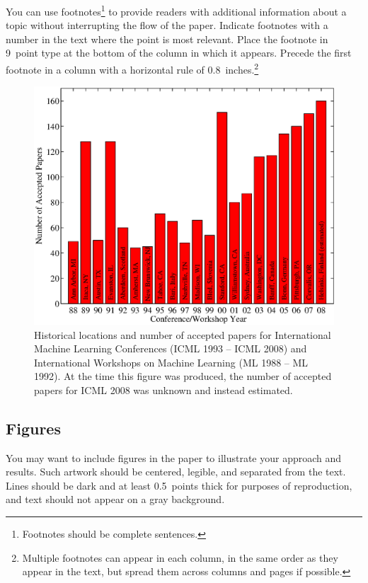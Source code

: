 \documentclass{article}
\begin{document}
You can use footnotes\footnote{Footnotes
should be complete sentences.} to provide readers with additional
information about a topic without interrupting the flow of the paper.
Indicate footnotes with a number in the text where the point is most
relevant. Place the footnote in 9~point type at the bottom of the
column in which it appears. Precede the first footnote in a column
with a horizontal rule of 0.8~inches.\footnote{Multiple footnotes can
appear in each column, in the same order as they appear in the text,
but spread them across columns and pages if possible.}

\begin{figure}[ht]
\vskip 0.2in
\begin{center}
\centerline{\includegraphics[width=\columnwidth]{icml_numpapers}}
\caption{Historical locations and number of accepted papers for International
Machine Learning Conferences (ICML 1993 -- ICML 2008) and International
Workshops on Machine Learning (ML 1988 -- ML 1992). At the time this figure was
produced, the number of accepted papers for ICML 2008 was unknown and instead
estimated.}
\label{icml-historical}
\end{center}
\vskip -0.2in
\end{figure}

\subsection{Figures}

You may want to include figures in the paper to illustrate
your approach and results. Such artwork should be centered,
legible, and separated from the text. Lines should be dark and at
least 0.5~points thick for purposes of reproduction, and text should
not appear on a gray background.
\end{document}
